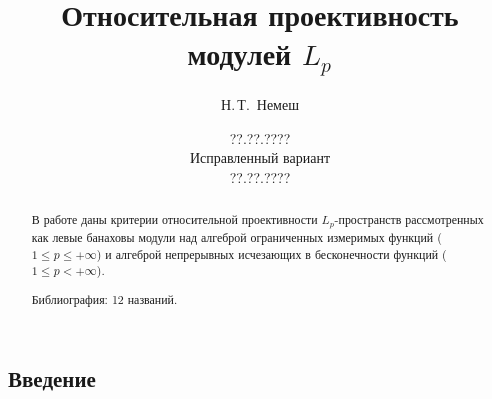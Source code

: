 \documentclass[12pt]{article}
\numberwithin{equation}{subsection}
\theoremstyle{plain}
\begin{document}

\date{??.??.????\\Исправленный вариант\\??.??.????}

\author{Н.\,Т.~Немеш}
\address{Московский государственный университет \\им. М. В. Ломоносова}

\title{Относительная проективность модулей $L_p$}

\maketitle

\begin{fulltext}
    \begin{abstract}

        В работе даны критерии относительной проективности $L_p$-про\-странств
        рассмотренных как левые банаховы модули над алгеброй ограниченных
        измеримых функций ($1\leq p\leq+\infty$) и алгеброй непрерывных
        исчезающих в бесконечности функций ($1\leq p <+\infty$).

        Библиография: 12 названий.
    \end{abstract}



    \section{Введение}\label{SectionIntroduction}


\end{fulltext}
\end{document}
